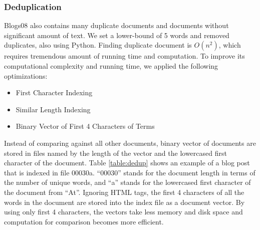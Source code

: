 \documentclass{sig-alternate}
\begin{document}
\subsubsection{Deduplication}

Blogs08 also contains many duplicate documents and documents without significant amount of text. We set a lower-bound of 5 words and removed duplicates, also using Python. Finding duplicate document is $O(n^2)$, which requires tremendous amount of running time and computation. To improve its computational complexity and running time, we applied the following optimizations:

\begin{itemize}
\item First Character Indexing
\item Similar Length Indexing
\item Binary Vector of First 4 Characters of Terms
\end{itemize}

Instead of comparing against all other documents, binary vector of documents are stored in files named by the length of the vector and the lowercased first character of the document. Table \ref{table:dedup} shows an example of a blog post that is indexed in file 00030a. ``00030'' stands for the document length in terms of the number of unique words, and ``a'' stands for the lowercased first character of the document from ``At''. Ignoring HTML tags, the first 4 characters of all the words in the document are stored into the index file as a document vector. By using only first 4 characters, the vectors take less memory and disk space and computation for comparison becomes more efficient.
\end{document}
